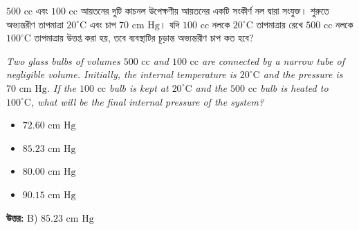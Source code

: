 \documentclass[12pt, a4paper]{article}
\begin{document}
\vspace{2em}

\begin{tcolorbox}[questionbox={প্রশ্ন (Question) 2}]
    \noindent
    $500\text{ cc}$ এবং $100\text{ cc}$ আয়তনের দুটি কাচনল উপেক্ষণীয় আয়তনের একটি সংকীর্ণ নল দ্বারা সংযুক্ত। শুরুতে অভ্যন্তরীণ তাপমাত্রা $20^\circ\text{C}$ এবং চাপ $70\text{ cm Hg}$। যদি $100\text{ cc}$ নলকে $20^\circ\text{C}$ তাপমাত্রায় রেখে $500\text{ cc}$ নলকে $100^\circ\text{C}$ তাপমাত্রায় উত্তপ্ত করা হয়, তবে ব্যবস্থাটির চূড়ান্ত অভ্যন্তরীণ চাপ কত হবে?
    
    \vspace{0.8em}
    \begin{english}
    \noindent\textit{\color{darkgray}
    Two glass bulbs of volumes $500\text{ cc}$ and $100\text{ cc}$ are connected by a narrow tube of negligible volume. Initially, the internal temperature is $20^\circ\text{C}$ and the pressure is $70\text{ cm Hg}$. If the $100\text{ cc}$ bulb is kept at $20^\circ\text{C}$ and the $500\text{ cc}$ bulb is heated to $100^\circ\text{C}$, what will be the final internal pressure of the system?
    }
    \end{english}
\end{tcolorbox}

\begin{itemize}[label={}, leftmargin=1cm, itemsep=0.5em]
    \item[\textbf{A)}] $72.60\text{ cm Hg}$
    \item[\textbf{B)}] $85.23\text{ cm Hg}$
    \item[\textbf{C)}] $80.00\text{ cm Hg}$
    \item[\textbf{D)}] $90.15\text{ cm Hg}$
\end{itemize}

\vspace{0.5em}
\begin{tcolorbox}[answerbox]
    \textbf{\color{success} উত্তর:} B) $85.23\text{ cm Hg}$
\end{tcolorbox}
\vspace{1em}
\end{document}
